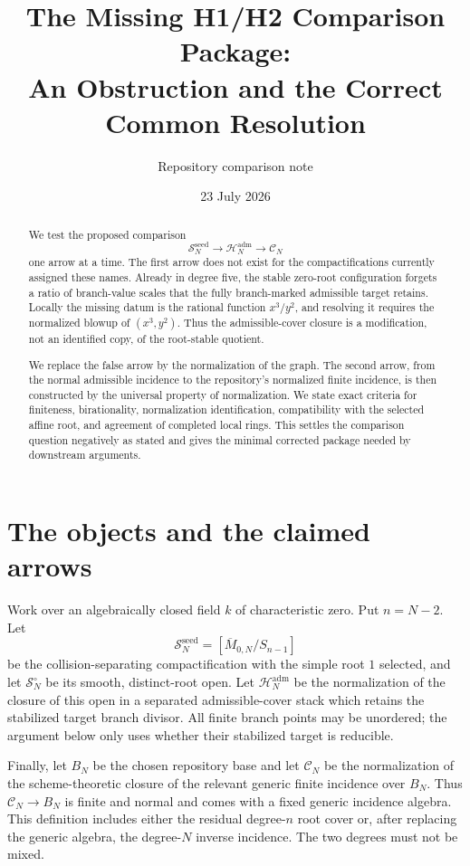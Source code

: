 \documentclass[11pt]{article}
\title{The Missing H1/H2 Comparison Package:\\
An Obstruction and the Correct Common Resolution}
\author{Repository comparison note}
\date{23 July 2026}
\newcommand{\Mbar}{\overline{M}}
\begin{document}
\maketitle

\begin{abstract}
We test the proposed comparison
\[
 \mathscr S_N^{\mathrm{seed}}
 \longrightarrow \mathscr H_N^{\mathrm{adm}}
 \longrightarrow \mathcal C_N
\]
one arrow at a time.  The first arrow does not exist for the compactifications
currently assigned these names.  Already in degree five, the stable
zero-root configuration forgets a ratio of branch-value scales that the
fully branch-marked admissible target retains.  Locally the missing datum is
the rational function $x^3/y^2$, and resolving it requires the normalized
blowup of $(x^3,y^2)$.  Thus the admissible-cover closure is a modification,
not an identified copy, of the root-stable quotient.

We replace the false arrow by the normalization of the graph.  The second
arrow, from the normal admissible incidence to the repository's normalized
finite incidence, is then constructed by the universal property of
normalization.  We state exact criteria for finiteness, birationality,
normalization identification, compatibility with the selected affine root,
and agreement of completed local rings.  This settles the comparison
question negatively as stated and gives the minimal corrected package needed
by downstream arguments.
\end{abstract}

\section{The objects and the claimed arrows}

Work over an algebraically closed field $k$ of characteristic zero.  Put
$n=N-2$.  Let
\[
 \mathscr S_N^{\mathrm{seed}}
   =[\Mbar_{0,N}/S_{n-1}]
\]
be the collision-separating compactification with the simple root $1$
selected, and let $\mathscr S_N^\circ$ be its smooth, distinct-root open.
Let $\mathscr H_N^{\mathrm{adm}}$ be the normalization of the closure of
this open in a separated admissible-cover stack which retains the stabilized
target branch divisor.  All finite branch points may be unordered; the
argument below only uses whether their stabilized target is reducible.

Finally, let $B_N$ be the chosen repository base and let $\mathcal C_N$ be
the normalization of the scheme-theoretic closure of the relevant generic
finite incidence over $B_N$.  Thus $\mathcal C_N\to B_N$ is finite and
normal and comes with a fixed generic incidence algebra.  This definition
includes either the residual degree-$n$ root cover or, after replacing the
generic algebra, the degree-$N$ inverse incidence.  The two degrees must not
be mixed.
\end{document}
